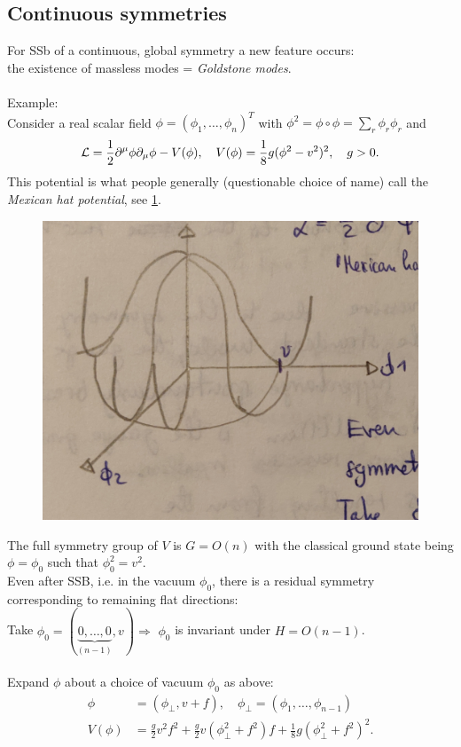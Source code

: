\subsection{Continuous symmetries}
For SSb of a continuous, global symmetry a new feature occurs:\\
the existence of massless modes = \emph{Goldstone modes}.\\
\\
Example:\\
Consider a real scalar field $\phi=(\phi_1,\dots,\phi_n)^T$ with $\phi^2 = \phi \circ \phi = \sum_r \phi_r \phi_r$ and
\begin{equation}
\mathcal{L} = \frac{1}{2} \partial^\mu \phi \partial_\mu \phi - V(\phi), \quad V(\phi)= \frac{1}{8} g (\phi^2-v^2)^2, \quad g>0.
\end{equation}
This potential is what people generally (questionable choice of name) call the \emph{Mexican hat potential}, see \ref{fig:mexicanhatpotential}.
\begin{figure}[h!]
	\centering
	\includegraphics[width=0.7\linewidth]{gfx/YMpictures/MexicanHatPotential}
	\caption{}
	\label{fig:mexicanhatpotential}
\end{figure}
The full symmetry group of $V$ is $G=O(n)$ with the classical ground state being $\phi=\phi_0$ such that $\phi^2_0=v^2$.\\
Even after SSB, i.e. in the vacuum $\phi_0$, there is a residual symmetry corresponding to remaining flat directions:\\
Take $\phi_0=(\underbrace{0,\dots,0}_{(n-1)}, v) \Rightarrow$ $\phi_0$ is invariant under $H=O(n-1)$.\\
\\
Expand $\phi$ about a choice of vacuum $\phi_0$ as above:
\begin{align*}
	\phi&= (\phi_\perp, v+f),\quad \phi_\perp = (\phi_1,\dots,\phi_{n-1}) \\
	V(\phi)&= \frac{g}{2} v^2 f^2 + \frac{g}{2} v (\phi^2_\perp + f^2)f+ \frac{1}{8} g (\phi^2_\perp +f^2)^2.
\end{align*}
